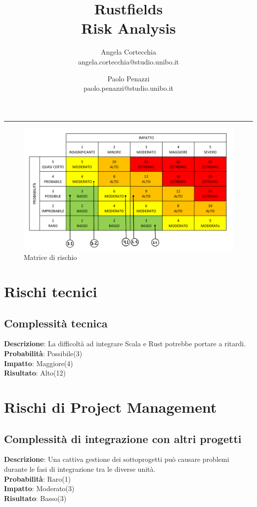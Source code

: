 \documentclass[12pt, a4paper]{article}
\title{\LARGE
    Rustfields \\ 
    \small
    Risk Analysis
    }
\author{
    Angela Cortecchia \\ 
    \small 
    angela.cortecchia@studio.unibo.it
    \and
    Paolo Penazzi \\ 
    \small
    paolo.penazzi@studio.unibo.it
}
\date{\small }
\begin{document}
\maketitle
\par\noindent\rule{\textwidth}{0.5pt}

\begin{figure}[ht]
    \centering %
    \includegraphics[width=1\linewidth]{images/risk_matrix.png}
    \caption{Matrice di rischio}
    \label{fig:matrix}
\end{figure}

\section{Rischi tecnici}
\subsection{Complessità tecnica}
\textbf{Descrizione}: La difficoltà ad integrare Scala e Rust potrebbe portare a ritardi.\\
\textbf{Probabilità}: Possibile(3)\\
\textbf{Impatto}:  Maggiore(4)\\
\textbf{Risultato}: Alto(12)\\

\section{Rischi di Project Management}
\subsection{Complessità di integrazione con altri progetti}
\textbf{Descrizione}: Una cattiva gestione dei sottoprogetti può causare problemi durante le fasi di integrazione tra le diverse unità.\\
\textbf{Probabilità}: Raro(1)\\
\textbf{Impatto}: Moderato(3)\\
\textbf{Risultato}: Basso(3)\\
\end{document}
